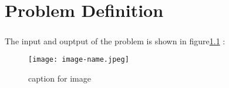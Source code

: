 \chapter{Problem Definition}

\paragraph{} 
\paragraph{}The input and ouptput of the problem is shown in figure\ref{pd} :
 
\begin{figure}[ht!]
\centering
\texttt{[image: image-name.jpeg]}\\[0.1in]
\caption{caption for image}
\label{pd}
\end{figure}


 

